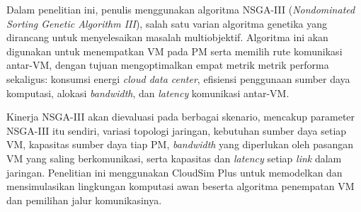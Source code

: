 Dalam penelitian ini, penulis menggunakan algoritma NSGA-III (\textit{Nondominated Sorting Genetic Algorithm III}), salah satu varian algoritma genetika yang dirancang untuk menyelesaikan masalah multiobjektif. Algoritma ini akan digunakan untuk menempatkan VM pada PM serta memilih rute komunikasi antar-VM, dengan tujuan mengoptimalkan empat metrik metrik performa sekaligus: konsumsi energi \textit{cloud data center}, efisiensi penggunaan sumber daya komputasi, alokasi \textit{bandwidth}, dan \textit{latency} komunikasi antar-VM.

Kinerja NSGA-III akan dievaluasi pada berbagai skenario, mencakup parameter NSGA-III itu sendiri, variasi topologi jaringan, kebutuhan sumber daya setiap VM, kapasitas sumber daya tiap PM, \textit{bandwidth} yang diperlukan oleh pasangan VM yang saling berkomunikasi, serta kapasitas dan \textit{latency} setiap \textit{link} dalam jaringan. Penelitian ini menggunakan CloudSim Plus untuk memodelkan dan mensimulasikan lingkungan komputasi awan beserta algoritma penempatan VM dan pemilihan jalur komunikasinya.
